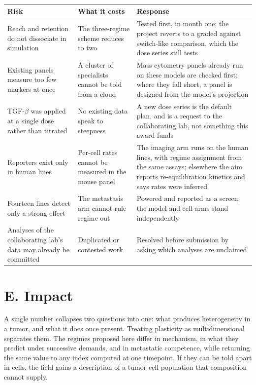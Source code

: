 \documentclass[12pt,letterpaper]{article}
\begin{document}
\begin{table}[htbp]
\centering
\footnotesize
\begin{tabular}{@{}p{}p{}p{}@{}}
\toprule
\textbf{Risk} & \textbf{What it costs} & \textbf{Response} \\
\midrule
Reach and retention do not dissociate in simulation & The three-regime scheme reduces to two & Tested first, in month one; the project reverts to a graded against switch-like comparison, which the dose series still tests \\
\addlinespace
Existing panels measure too few markers at once & A cluster of specialists cannot be told from a cloud & Mass cytometry panels already run on these models are checked first; where they fall short, a panel is designed from the model's projection \\
\addlinespace
TGF-$\beta$ was applied at a single dose rather than titrated & No existing data speak to steepness & A new dose series is the default plan, and is a request to the collaborating lab, not something this award funds \\
\addlinespace
Reporters exist only in human lines & Per-cell rates cannot be measured in the mouse panel & The imaging arm runs on the human lines, with regime assignment from the same assays; elsewhere the aim reports re-equilibration kinetics and says rates were inferred \\
\addlinespace
Fourteen lines detect only a strong effect & The metastasis arm cannot rule regime out & Powered and reported as a screen; the model and cell arms stand independently \\
\addlinespace
Analyses of the collaborating lab's data may already be committed & Duplicated or contested work & Resolved before submission by asking which analyses are unclaimed \\
\bottomrule
\end{tabular}
\end{table}

\section{E. Impact}

A single number collapses two questions into one: what produces heterogeneity in a tumor, and what it does once present. Treating plasticity as multidimensional separates them. The regimes proposed here differ in mechanism, in what they predict under successive demands, and in metastatic competence, while returning the same value to any index computed at one timepoint. If they can be told apart in cells, the field gains a description of a tumor cell population that composition cannot supply.
\end{document}
